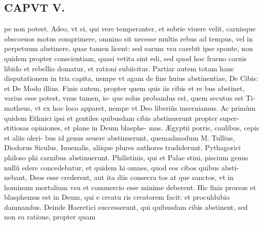 \documentclass{article}
\begin{document}
\begin{pages}
\section*{CAPVT  V. }
\marginpar{[ p.373 ]}\pstart pe non potest. Adeo, vt ei, qui vere temperanter, et sobrie viuere velit, carnisque obscoenos motus comprimere, omnino sit necesse multis rebus ad tempus, vel in perpetuum abstinere, quae tamen licent: sed earum vsu carebit ipse sponte, non quidem propter conscientiam, quasi vetita sint edi, sed quod hoc fraeno carnis libido et rebellio domatur, et rationi subiicitur. Partiar autem totam hanc disputationem in tria capita, nempe vt agam de fine huius abstinentiae, De Cibis: et De Modo illius.  \pend\pstart Finis autem, propter quem quis iis cibis et re bus abstinet, varius esse potest, vnus tamen, is- que solus probandus est, quem secutus est Ti- motheus, vt ex hoc loco apparet, nempe vt Deo liberiùs inseruiamus.  \pend\pstart Ac primùm quidem Ethnici ipsi et gentiles quibusdam cibis abstinuerunt propter super- stitiosas opiniones, et plane in Deum blasphe- mas. Ægyptii porris, caulibus, cepis et aliis oleri- bus id genus seuere abstinuerunt, quemadmodum M. Tullius, Diodorus Siculus, Iuuenalis, aliique plures authores tradiderunt. Pythagorici philoso phi carnibus abstinuerunt. Philistinis, qui et Palae stini, piscium genus nullû edere concedebatur, et quidem hi omnes, quod eos cibos quibus absti- nebant, Deos esse crederent, aut ita diis consecra tos at que sanctos, vt in hominum mortalium vsu et commercio esse minime deberent. Hic finis prorsus et blasphemus est in Deum, qui e creatu ris creatorem facit: et proculdubio damnandus.  \pend\pstart Deinde Haeretici successerunt, qui quibusdam cibis abstinent, sed non ea ratione, propter quam  \pend

\end{pages}
\end{document}
